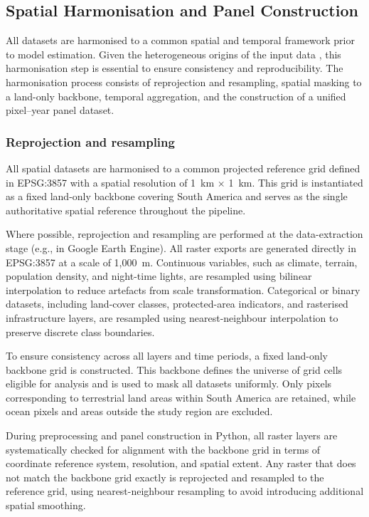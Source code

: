 \documentclass[12pt]{article}
\theoremstyle{break} %
\begin{document}
\subsection{Spatial Harmonisation and Panel Construction}
\label{Spatial-Harmonisation}

All datasets are harmonised to a common spatial and temporal framework prior to model estimation. Given the heterogeneous origins of the input data , this harmonisation step is essential to ensure consistency and reproducibility. The harmonisation process consists of reprojection and resampling, spatial masking to a land-only backbone, temporal aggregation, and the construction of a unified pixel--year panel dataset.

\subsubsection{Reprojection and resampling}
\label{resampling}

All spatial datasets are harmonised to a common projected reference grid defined in EPSG:3857 with a spatial resolution of 1~km $\times$ 1~km. This grid is instantiated as a fixed land-only backbone covering South America and serves as the single authoritative spatial reference throughout the pipeline.

Where possible, reprojection and resampling are performed at the data-extraction stage (e.g., in Google Earth Engine). All raster exports are generated directly in EPSG:3857 at a scale of 1,000~m. Continuous variables, such as climate, terrain, population density, and night-time lights, are resampled using bilinear interpolation to reduce artefacts from scale transformation. Categorical or binary datasets, including land-cover classes, protected-area indicators, and rasterised infrastructure layers, are resampled using nearest-neighbour interpolation to preserve discrete class boundaries.

To ensure consistency across all layers and time periods, a fixed land-only backbone grid is constructed. This backbone defines the universe of grid cells eligible for analysis and is used to mask all datasets uniformly. Only pixels corresponding to terrestrial land areas within South America are retained, while ocean pixels and areas outside the study region are excluded.

During preprocessing and panel construction in Python, all raster layers are systematically checked for alignment with the backbone grid in terms of coordinate reference system, resolution, and spatial extent. Any raster that does not match the backbone grid exactly is reprojected and resampled to the reference grid, using nearest-neighbour resampling to avoid introducing additional spatial smoothing.
\end{document}
